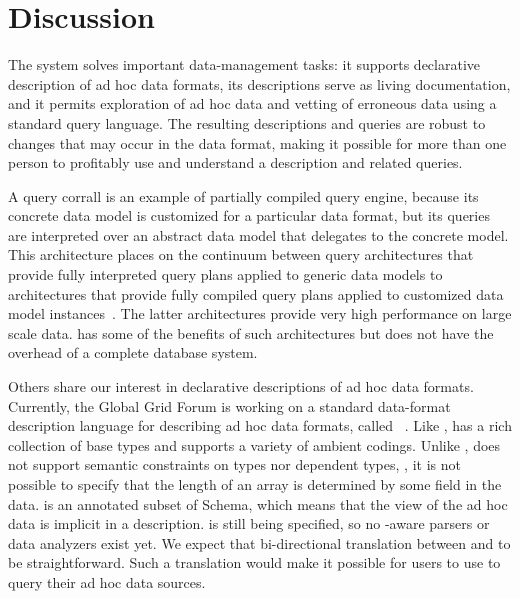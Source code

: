 \section{Discussion}
\label{section:relatedwork}
\label{section:future}

The \padx{} system solves important data-management tasks: it supports
declarative description of ad hoc data formats, its descriptions serve
as living documentation, and it permits exploration of ad hoc data and
vetting of erroneous data using a standard query language.  The
resulting \pads{} descriptions and queries are robust to changes that
may occur in the data format, making it possible for more than one
person to profitably use and understand a \padx{} description and
related queries.

A \padx{} query corrall is an example of partially compiled query
engine, because its concrete data model is customized for a particular
data format, but its queries are interpreted over an abstract data
model that delegates to the concrete model.  This architecture places
\padx{} on the continuum between query architectures that provide
fully interpreted query plans applied to generic data models to
architectures that provide fully compiled query plans applied to
customized data model instances~\cite{daytona}.  The latter
architectures provide very high performance on large scale data.
\padx{} has some of the benefits of such architectures but does not
have the overhead of a complete database system. 

Others share our interest in declarative descriptions of ad hoc data
formats.    Currently, the Global Grid Forum is working on a standard
data-format description language for describing ad hoc data formats,
called \dfdl{}~\cite{dfdl-proposal,dfdl-primer}.  Like \pads{},
\dfdl{} has a rich collection of base types and supports a variety of
ambient codings.  Unlike \pads{}, \dfdl{} does not support semantic
constraints on types nor dependent types, \eg{}, it is not possible to
specify that the length of an array is determined by some field in the
data.  \dfdl{} is an annotated subset of \Xml{} Schema, which means
that the \Xml{} view of the ad hoc data is implicit in a \dfdl{}
description.  \dfdl{} is still being specified, so no \dfdl{}-aware
parsers or data analyzers exist yet.  We expect that bi-directional
translation between \pads{} and \dfdl{} to be straightforward.  Such a
translation would make it possible for \dfdl{} users to use 
\padx{} to query their ad hoc data sources.

